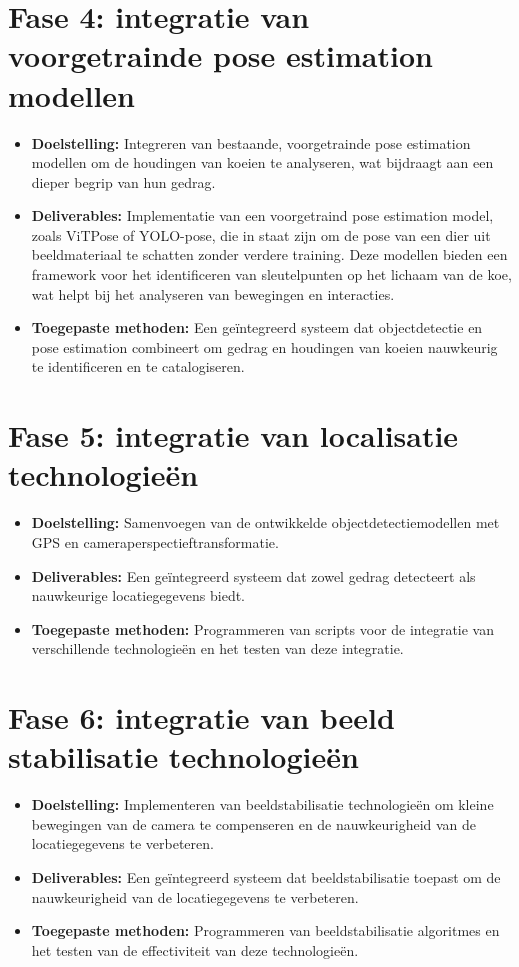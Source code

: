 \section{Fase 4: integratie van voorgetrainde pose estimation modellen}
\begin{itemize}
    \item \textbf{Doelstelling:} Integreren van bestaande, voorgetrainde pose estimation modellen om de houdingen van koeien te analyseren, wat bijdraagt aan een dieper begrip van hun gedrag.
    \item \textbf{Deliverables:}  Implementatie van een voorgetraind pose estimation model, zoals ViTPose of YOLO-pose, die in staat zijn om de pose van een dier uit beeldmateriaal te schatten zonder verdere training. Deze modellen bieden een framework voor het identificeren van sleutelpunten op het lichaam van de koe, wat helpt bij het analyseren van bewegingen en interacties.
    \item \textbf{Toegepaste methoden:} Een geïntegreerd systeem dat objectdetectie en pose estimation combineert om gedrag en houdingen van koeien nauwkeurig te identificeren en te catalogiseren.
\end{itemize}
\section{Fase 5: integratie van localisatie technologieën}
\begin{itemize}
    \item \textbf{Doelstelling:} Samenvoegen van de ontwikkelde objectdetectiemodellen met GPS en cameraperspectieftransformatie.
    \item \textbf{Deliverables:}  Een geïntegreerd systeem dat zowel gedrag detecteert als nauwkeurige locatiegegevens biedt.
    \item \textbf{Toegepaste methoden:} Programmeren van scripts voor de integratie van verschillende technologieën en het testen van deze integratie.
\end{itemize}
\section{Fase 6: integratie van beeld stabilisatie technologieën}
\begin{itemize}
    \item \textbf{Doelstelling:} Implementeren van beeldstabilisatie technologieën om kleine bewegingen van de camera te compenseren en de nauwkeurigheid van de locatiegegevens te verbeteren.
    \item \textbf{Deliverables:} Een geïntegreerd systeem dat beeldstabilisatie toepast om de nauwkeurigheid van de locatiegegevens te verbeteren.
    \item \textbf{Toegepaste methoden:} Programmeren van beeldstabilisatie algoritmes en het testen van de effectiviteit van deze technologieën.
\end{itemize}
